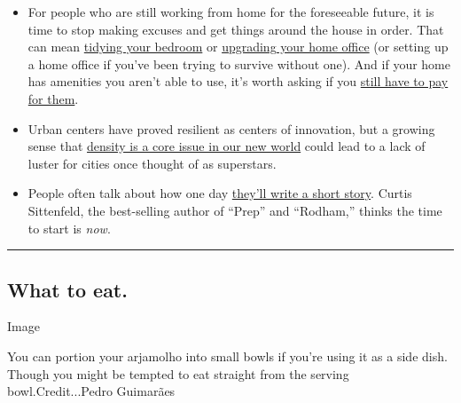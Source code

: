 \begin{itemize}
\item
  For people who are still working from home for the foreseeable future,
  it is time to stop making excuses and get things around the house in
  order. That can mean
  \href{https://www.nytimes.com/interactive/2020/07/20/burst/bedroom-organization-tips.html}{tidying
  your bedroom} or
  \href{https://www.nytimes.com/2020/07/21/realestate/that-home-office-of-yours-it-needs-an-upgrade.html}{upgrading
  your home office} (or setting up a home office if you've been trying
  to survive without one). And if your home has amenities you aren't
  able to use, it's worth asking if you
  \href{https://www.nytimes.com/2020/07/18/realestate/gym-playroom-fees-coronavirus.html}{still
  have to pay for them}.
\item
  Urban centers have proved resilient as centers of innovation, but a
  growing sense that
  \href{https://www.nytimes.com/2020/07/21/business/economy/coronavirus-cities.html}{density
  is a core issue in our new world} could lead to a lack of luster for
  cities once thought of as superstars.
\item
  People often talk about how one day
  \href{https://www.nytimes.com/2020/07/18/at-home/coronavirus-fiction-writing.html}{they'll
  write a short story}. Curtis Sittenfeld, the best-selling author of
  ``Prep'' and ``Rodham,'' thinks the time to start is \emph{now}.
\end{itemize}

\begin{center}\rule{0.5\linewidth}{\linethickness}\end{center}

\hypertarget{what-to-eat}{%
\subsection{What to eat.}\label{what-to-eat}}

Image

You can portion your arjamolho into small bowls if you're using it as a
side dish. Though you might be tempted to eat straight from the serving
bowl.Credit...Pedro Guimarães

